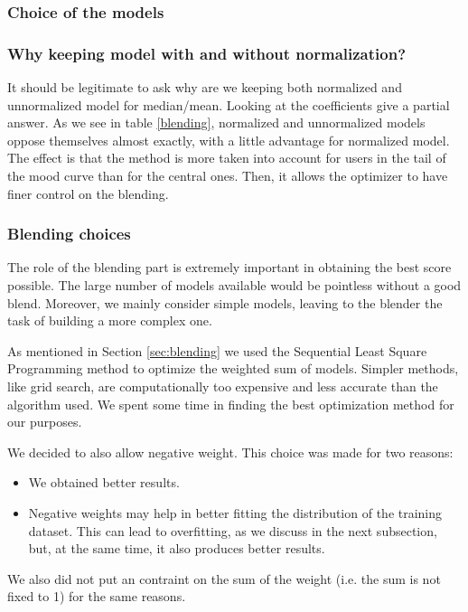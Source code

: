\documentclass[10pt,conference,compsocconf]{IEEEtran}
\begin{document}
\subsubsection{Choice of the models}

\subsubsection{Why keeping model with and without normalization?}

It should be legitimate to ask why are we keeping both normalized and unnormalized model for
median/mean. Looking at the coefficients give a partial answer. As we see in table \ref{blending}, normalized and unnormalized models oppose themselves almost exactly, with a little advantage for normalized model. The effect is that the method is more taken into account for users in the tail of the mood curve than for the central ones. Then, it allows the optimizer to have finer control on the blending.

\subsubsection{Blending choices}
The role of the blending part is extremely important in obtaining the best score possible. The large
number of models available would be pointless without a good blend. Moreover, we mainly consider
simple models, leaving to the blender the task of building a more complex one.

As mentioned in Section \ref{sec:blending} we used the Sequential Least Square Programming method to
optimize the weighted sum of models. Simpler methods, like grid search, are computationally too
expensive and less accurate than the algorithm used. We spent some time in finding the best
optimization method for our purposes.

We decided to also allow negative weight. This choice was made for two reasons:
\begin{itemize}
\item We obtained better results.
\item Negative weights may help in better fitting the distribution of the training dataset. This can
lead to overfitting, as we discuss in the next subsection, but, at the same time, it also produces
better results.
\end{itemize}
We also did not put an contraint on the sum of the weight (i.e. the sum is not fixed  to 1) for the
same reasons.
\end{document}
